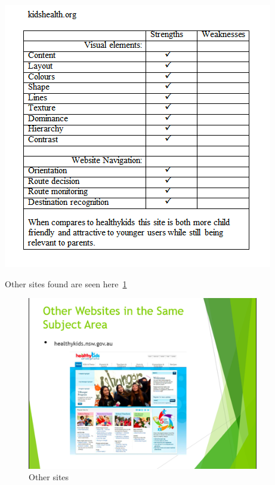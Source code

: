 \documentclass[letterpaper,twoside,12pt]{article}
\begin{document}
\includegraphics{assets/jpg/tab3}

Other sites found are seen here~\cref{fig:othersites}


\begin{figure}[ht!]
  \centering
  \includegraphics[width=0.9\textwidth]{assets/jpg/othersite_1}
  \caption{Other sites}
  \label{fig:othersites}
\end{figure}
\FloatBarrier
\end{document}

